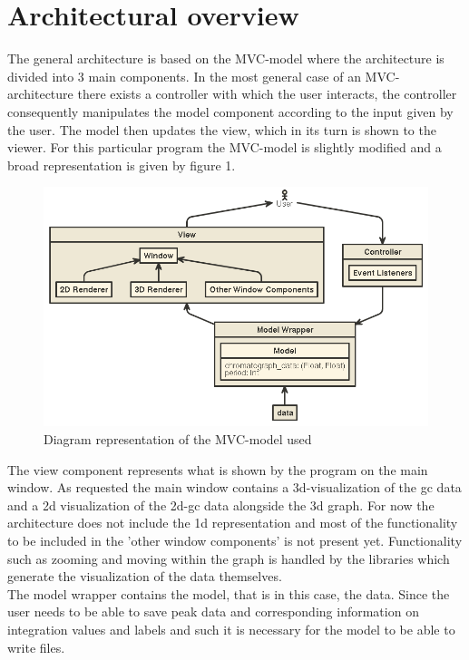 \documentclass{article}
\begin{document}
\section*{Architectural overview}
The general architecture is based on the MVC-model where the architecture is divided into 3 main components. In the most general case of an MVC-architecture there exists a controller with which the user interacts, the controller consequently manipulates the model component according to the input given by the user. The model then updates the view, which in its turn is shown to the viewer. For this particular program the MVC-model is slightly modified and a broad representation is given by figure 1.\\

\begin{figure}[h]
    \centering
    \includegraphics[scale=0.5]{nomnoml.png}
    \caption{Diagram representation of the MVC-model used}
    \label{fig:my_label}
\end{figure}
The view component represents what is shown by the program on the main window. As requested the main window contains a 3d-visualization of the gc data and a 2d visualization of the 2d-gc data alongside the 3d graph. For now the architecture does not include the 1d representation and most of the functionality to be included in the 'other window components' is not present yet. Functionality such as zooming and moving within the graph is handled by the libraries which generate the visualization of the data themselves. \\

The model wrapper contains the model, that is in this case, the data. Since the user needs to be able to save peak data and corresponding information on integration values and labels and such it is necessary for the model to be able to write files.\\
\end{document}
